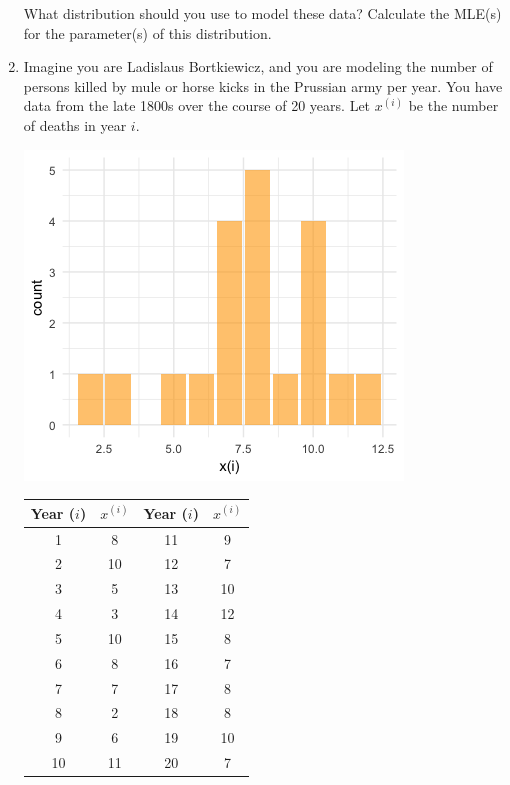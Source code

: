 \begin{enumerate}
What distribution should you use to model these data? Calculate the MLE(s) for the parameter(s) of this distribution.
\vspace{3mm}

\item Imagine you are Ladislaus Bortkiewicz, and you are modeling the number of persons killed by mule or horse kicks in the Prussian army per year. You have data from the late 1800s over the course of 20 years. Let $x^{(i)}$ be the number of deaths in year $i$.

\begin{minipage}[c]{0.5\textwidth}
\begin{center}
\includegraphics[width=\textwidth]{img/l01-problem4.png}
\end{center}
\end{minipage}
\begin{minipage}[c]{0.5\textwidth}
\begin{center}{\small
\begin{tabular}{cc|cc}
\toprule
Year ($i$) & $x^{(i)}$ & Year ($i$) & $x^{(i)}$ \\
\midrule
1 & 8 & 11 & 9 \\
2 & 10 & 12 & 7 \\
3 & 5 & 13 & 10 \\
4 & 3 & 14 & 12 \\
5 & 10 & 15 & 8 \\
6 & 8 & 16 & 7 \\
7 & 7 & 17 & 8 \\
8 & 2 & 18 & 8 \\
9 & 6 & 19 & 10 \\
10 & 11 & 20 & 7 \\
\end{tabular}}
\end{center}
\end{minipage}
\vspace{3mm}


\end{enumerate}

